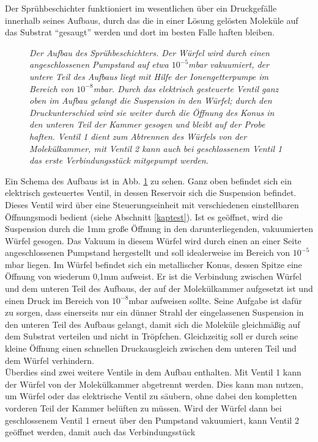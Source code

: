 Der Sprühbeschichter funktioniert im wesentlichen über ein Druckgefälle innerhalb seines Aufbaus, durch das
die in einer Lösung gelösten Moleküle auf das Substrat "`gesaugt"' werden und dort im besten
Falle haften bleiben. 
\begin{figure}
\centering
\sffamily

\caption{\textit{Der Aufbau des Sprühbeschichters.
Der Würfel wird durch einen angeschlossenen Pumpstand auf etwa $10^{-5}$mbar vakuumiert, der untere
Teil des Aufbaus liegt mit Hilfe der Ionengetterpumpe im Bereich von $10^{-8}$mbar. Durch das
elektrisch gesteuerte Ventil ganz oben im Aufbau gelangt die Suspension in den Würfel; durch den
Druckunterschied wird sie weiter durch die Öffnung des Konus in den unteren Teil der Kammer gesogen
und bleibt auf der Probe haften. Ventil 1 dient zum Abtrennen des Würfels von der Molekülkammer, mit
Ventil 2 kann auch bei geschlossenem Ventil 1 das erste Verbindungsstück mitgepumpt werden.
}}
\label{sbaufbau}
\end{figure}
Ein Schema des Aufbaus ist in Abb. \ref{sbaufbau} zu sehen. Ganz oben befindet sich ein elektrisch
gesteuertes Ventil, in dessen Reservoir sich die Suspension befindet. Dieses Ventil wird über eine
Steuerungseinheit mit verschiedenen einstellbaren Öffnungsmodi bedient (siehe Abschnitt \ref{kaptest}). Ist es
geöffnet, wird die Suspension durch die 1mm große Öffnung in den darunterliegenden, vakuumierten Würfel
gesogen. Das Vakuum in diesem Würfel wird durch einen an einer Seite angeschlossenen Pumpstand hergestellt
und soll idealerweise im Bereich von $10^{-5}$mbar liegen. Im Würfel befindet sich ein metallischer
Konus, dessen Spitze eine Öffnung von wiederum 0,1mm aufweist. Er ist die Verbindung zwischen Würfel und dem
unteren Teil des Aufbaus, der auf der Molekülkammer aufgesetzt ist und einen Druck im Bereich von
$10^{-8}$mbar aufweisen sollte.  
Seine Aufgabe ist dafür zu sorgen, dass einerseits nur ein dünner Strahl der eingelassenen Suspension in
den unteren Teil des Aufbaus gelangt, damit sich die Moleküle gleichmäßig auf dem Substrat verteilen und
nicht in Tröpfchen. Gleichzeitig soll er durch seine kleine Öffnung einen schnellen Druckausgleich zwischen
dem unteren Teil und dem Würfel verhindern. \\
Überdies sind zwei weitere Ventile in dem Aufbau enthalten. Mit Ventil 1 kann der Würfel von der
Molekülkammer abgetrennt werden. Dies kann man nutzen, um Würfel oder das elektrische Ventil zu säubern, ohne
dabei den kompletten vorderen Teil der Kammer belüften zu müssen. Wird der Würfel dann bei
geschlossenem Ventil 1 erneut über den Pumpstand vakuumiert, kann Ventil 2 geöffnet werden, damit auch das Verbindungsstück

